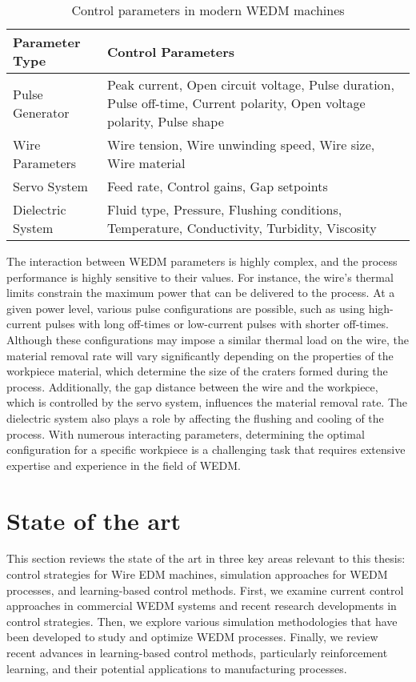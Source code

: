 \documentclass[11pt]{article}
\begin{document}
\begin{table}[h]
    \centering
    \begin{tabular}{p{3cm}p{6cm}}
        \hline
        Parameter Type & Control Parameters \\
        \hline
        Pulse Generator & Peak current, Open circuit voltage, Pulse duration, Pulse off-time, Current polarity, Open voltage polarity, Pulse shape \\
        \hline
        Wire Parameters & Wire tension, Wire unwinding speed, Wire size, Wire material \\
        \hline
        Servo System & Feed rate, Control gains, Gap setpoints\\
        \hline
        Dielectric System &  Fluid type, Pressure, Flushing conditions, Temperature, Conductivity, Turbidity, Viscosity\\
        \hline
    \end{tabular}
    \caption{Control parameters in modern WEDM machines}
    \label{tab:wedm_parameters}
\end{table}

The interaction between WEDM parameters is highly complex, and the process performance is highly sensitive to their values. For instance, the wire's thermal limits constrain the maximum power that can be delivered to the process. At a given power level, various pulse configurations are possible, such as using high-current pulses with long off-times or low-current pulses with shorter off-times. Although these configurations may impose a similar thermal load on the wire, the material removal rate will vary significantly depending on the properties of the workpiece material, which determine the size of the craters formed during the process. Additionally, the gap distance between the wire and the workpiece, which is controlled by the servo system, influences the material removal rate. The dielectric system also plays a role by affecting the flushing and cooling of the process. With numerous interacting parameters, determining the optimal configuration for a specific workpiece is a challenging task that requires extensive expertise and experience in the field of WEDM.

\section{State of the art}

This section reviews the state of the art in three key areas relevant to this thesis: control strategies for Wire EDM machines, simulation approaches for WEDM processes, and learning-based control methods. First, we examine current control approaches in commercial WEDM systems and recent research developments in control strategies. Then, we explore various simulation methodologies that have been developed to study and optimize WEDM processes. Finally, we review recent advances in learning-based control methods, particularly reinforcement learning, and their potential applications to manufacturing processes.
\end{document}
